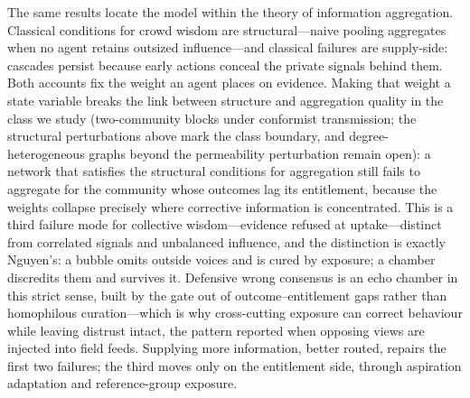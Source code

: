 \documentclass[11pt]{article}
\newcommand{\1}{\mathbf{1}}
\begin{document}
The same results locate the model within the theory of information aggregation. Classical conditions for crowd wisdom are structural---naive pooling aggregates when no agent retains outsized influence\cite{DeGroot1974,GolubJackson2010}---and classical failures are supply-side: cascades persist because early actions conceal the private signals behind them\cite{Banerjee1992,BikhchandaniHirshleiferWelch1992}. Both accounts fix the weight an agent places on evidence. Making that weight a state variable breaks the link between structure and aggregation quality in the class we study (two-community blocks under conformist transmission; the structural perturbations above mark the class boundary, and degree-heterogeneous graphs beyond the permeability perturbation remain open): a network that satisfies the structural conditions for aggregation still fails to aggregate for the community whose outcomes lag its entitlement, because the weights collapse precisely where corrective information is concentrated. This is a third failure mode for collective wisdom---evidence refused at uptake---distinct from correlated signals and unbalanced influence, and the distinction is exactly Nguyen's\cite{Nguyen2020}: a bubble omits outside voices and is cured by exposure; a chamber discredits them and survives it. Defensive wrong consensus is an echo chamber in this strict sense, built by the gate out of outcome--entitlement gaps rather than homophilous curation\cite{Cinelli2021}---which is why cross-cutting exposure can correct behaviour while leaving distrust intact, the pattern reported when opposing views are injected into field feeds\cite{Bail2018}. Supplying more information, better routed, repairs the first two failures; the third moves only on the entitlement side, through aspiration adaptation and reference-group exposure.
\end{document}
